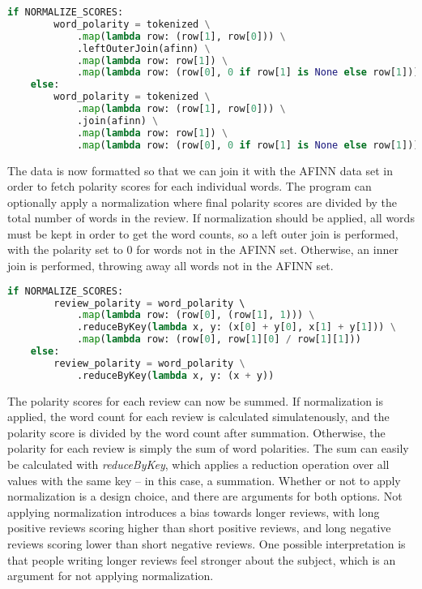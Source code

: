\documentclass[a4paper]{article}
\begin{document}
\begin{lstlisting}[language=python]
    if NORMALIZE_SCORES:
        word_polarity = tokenized \
            .map(lambda row: (row[1], row[0])) \
            .leftOuterJoin(afinn) \
            .map(lambda row: row[1]) \
            .map(lambda row: (row[0], 0 if row[1] is None else row[1]))
    else:
        word_polarity = tokenized \
            .map(lambda row: (row[1], row[0])) \
            .join(afinn) \
            .map(lambda row: row[1]) \
            .map(lambda row: (row[0], 0 if row[1] is None else row[1]))
\end{lstlisting}

The data is now formatted so that we can join it with the AFINN data set in order to fetch polarity scores for each individual words. The program can optionally apply a normalization where final polarity scores are divided by the total number of words in the review. If normalization should be applied, all words must be kept in order to get the word counts, so a left outer join is performed, with the polarity set to 0 for words not in the AFINN set. Otherwise, an inner join is performed, throwing away all words not in the AFINN set.


\begin{lstlisting}[language=python]
    if NORMALIZE_SCORES:
        review_polarity = word_polarity \ 
            .map(lambda row: (row[0], (row[1], 1))) \
            .reduceByKey(lambda x, y: (x[0] + y[0], x[1] + y[1])) \
            .map(lambda row: (row[0], row[1][0] / row[1][1]))
    else:
        review_polarity = word_polarity \
            .reduceByKey(lambda x, y: (x + y))
\end{lstlisting}

The polarity scores for each review can now be summed. If normalization is applied, the word count for each review is calculated simulatenously, and the polarity score is divided by the word count after summation. Otherwise, the polarity for each review is simply the sum of word polarities. The sum can easily be calculated with \emph{reduceByKey}, which applies a reduction operation over all values with the same key -- in this case, a summation. Whether or not to apply normalization is a design choice, and there are arguments for both options. Not applying normalization introduces a bias towards longer reviews, with long positive reviews scoring higher than short positive reviews, and long negative reviews scoring lower than short negative reviews. One possible interpretation is that people writing longer reviews feel stronger about the subject, which is an argument for not applying normalization.
\end{document}
